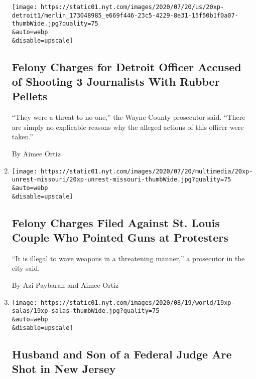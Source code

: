 \begin{enumerate}
  \texttt{[image: https://static01.nyt.com/images/2020/07/20/us/20xp-detroit1/merlin\_173048985\_e669f446-23c5-4229-8e31-15f50b1f0a07-thumbWide.jpg?quality=75\\\&auto=webp\\\&disable=upscale]}

  \hypertarget{felony-charges-for-detroit-officer-accused-of-shooting-3-journalists-with-rubber-pellets}{%
  \subsection{Felony Charges for Detroit Officer Accused of Shooting 3
  Journalists With Rubber
  Pellets}\label{felony-charges-for-detroit-officer-accused-of-shooting-3-journalists-with-rubber-pellets}}

  ``They were a threat to no one,'' the Wayne County prosecutor said.
  ``There are simply no explicable reasons why the alleged actions of
  this officer were taken.''

  By Aimee Ortiz
\item
  \href{/2020/07/20/us/mark-patricia-mccloskey-charges.html}{}

  \texttt{[image: https://static01.nyt.com/images/2020/07/20/multimedia/20xp-unrest-missouri/20xp-unrest-missouri-thumbWide.jpg?quality=75\\\&auto=webp\\\&disable=upscale]}

  \hypertarget{felony-charges-filed-against-st-louis-couple-who-pointed-guns-at-protesters}{%
  \subsection{Felony Charges Filed Against St. Louis Couple Who Pointed
  Guns at
  Protesters}\label{felony-charges-filed-against-st-louis-couple-who-pointed-guns-at-protesters}}

  ``It is illegal to wave weapons in a threatening manner,'' a
  prosecutor in the city said.

  By Azi Paybarah and Aimee Ortiz
\item
  \href{/2020/07/19/nyregion/shooting-nj-judge-esther-salas.html}{}

  \texttt{[image: https://static01.nyt.com/images/2020/08/19/world/19xp-salas/19xp-salas-thumbWide.jpg?quality=75\\\&auto=webp\\\&disable=upscale]}

  \hypertarget{husband-and-son-of-a-federal-judge-are-shot-in-new-jersey}{%
  \subsection{Husband and Son of a Federal Judge Are Shot in New
  Jersey}\label{husband-and-son-of-a-federal-judge-are-shot-in-new-jersey}}


\end{enumerate}
